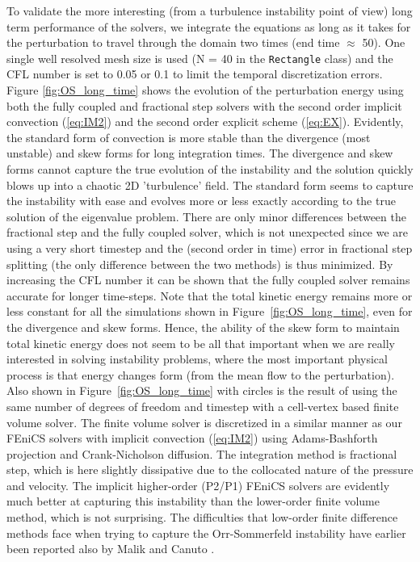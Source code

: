 To validate the more interesting (from a turbulence instability point of view) long term performance of the solvers, we integrate the equations as long as it takes for the perturbation to travel through the domain two times (end time $\approx$ 50). One single well resolved mesh size is used (N = 40 in the {\fontsize{12pt}{12pt}\texttt{Rectangle}} class) and the CFL number is set to 0.05 or 0.1 to limit the temporal discretization errors. Figure \ref{fig:OS_long_time} shows the evolution of the perturbation energy using both the fully coupled and fractional step solvers with the second order implicit convection (\ref{eq:IM2}) and the second order explicit scheme (\ref{eq:EX}). Evidently, the standard form of convection is more stable than the divergence (most unstable) and skew forms for long integration times. The divergence and skew forms cannot capture the true evolution of the instability and the solution quickly blows up into a chaotic 2D 'turbulence' field. The standard form seems to capture the instability with ease and evolves more or less exactly according to the true solution of the eigenvalue problem. There are only minor differences between the fractional step and the fully coupled solver, which is not unexpected since we are using a very short timestep and the (second order in time) error in fractional step splitting (the only difference between the two methods) is thus minimized. By increasing the CFL number it can be shown that the fully coupled solver remains accurate for longer time-steps. Note that the total kinetic energy remains more or less constant for all the simulations shown in Figure~\ref{fig:OS_long_time}, even for the divergence and skew forms. Hence, the ability of the skew form to maintain total kinetic energy does not seem to be all that important when we are really interested in solving instability problems, where the most important physical process is that energy changes form (from the mean flow to the perturbation). Also shown in Figure~\ref{fig:OS_long_time} with circles is the result of using the same number of degrees of freedom and timestep with a cell-vertex based finite volume solver. The finite volume solver is discretized in a similar manner as our FEniCS solvers with implicit convection (\ref{eq:IM2}) using Adams-Bashforth projection and Crank-Nicholson diffusion. The integration method is fractional step, which is here slightly dissipative due to the collocated nature of the pressure and velocity. The implicit higher-order (P2/P1) FEniCS solvers are evidently much better at capturing this instability than the lower-order finite volume method, which is not surprising. The difficulties that low-order finite difference methods face when trying to capture the Orr-Sommerfeld instability have earlier been reported also by Malik \cite{Malik1984} and Canuto \cite{canuto07}.
